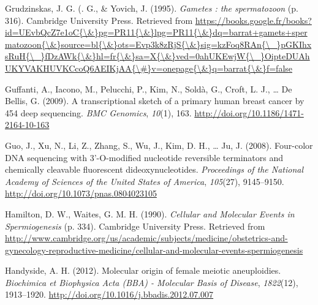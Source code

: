 \documentclass[12pt,twoside]{reedthesis}
\theoremstyle{definition}
\theoremstyle{definition}
\theoremstyle{remark}
\begin{document}
  \hypertarget{ref-Grudzinskas1995}{}
  Grudzinskas, J. G. (. G., \& Yovich, J. (1995). \emph{Gametes : the
  spermatozoon} (p. 316). Cambridge University Press. Retrieved from
  \href{https://books.google.fr/books?id=UEvbQcZ7e1oC\%7B/\&\%7Dpg=PR11\%7B/\&\%7Dlpg=PR11\%7B/\&\%7Ddq=barrat+gamets+spermatozoon\%7B/\&\%7Dsource=bl\%7B/\&\%7Dots=Evp3k8zRjS\%7B/\&\%7Dsig=kzFoq8RAn\%7B/_\%7DpGKIhxsRuH\%7B/_\%7DfDzAWk\%7B/\&\%7Dhl=fr\%7B/\&\%7Dsa=X\%7B/\&\%7Dved=0ahUKEwjW\%7B/_\%7DOipteDUAhUKYVAKHUVKCcoQ6AEIKjAA\%7B/\#\%7Dv=onepage\%7B/\&\%7Dq=barrat\%7B/\&\%7Df=false}{https://books.google.fr/books?id=UEvbQcZ7e1oC\{\textbackslash{}\&\}pg=PR11\{\textbackslash{}\&\}lpg=PR11\{\textbackslash{}\&\}dq=barrat+gamets+spermatozoon\{\textbackslash{}\&\}source=bl\{\textbackslash{}\&\}ots=Evp3k8zRjS\{\textbackslash{}\&\}sig=kzFoq8RAn\{\textbackslash{}\_\}pGKIhxsRuH\{\textbackslash{}\_\}fDzAWk\{\textbackslash{}\&\}hl=fr\{\textbackslash{}\&\}sa=X\{\textbackslash{}\&\}ved=0ahUKEwjW\{\textbackslash{}\_\}OipteDUAhUKYVAKHUVKCcoQ6AEIKjAA\{\textbackslash{}\#\}v=onepage\{\textbackslash{}\&\}q=barrat\{\textbackslash{}\&\}f=false}
  
  \hypertarget{ref-Guffanti2009}{}
  Guffanti, A., Iacono, M., Pelucchi, P., Kim, N., Soldà, G., Croft, L.
  J., \ldots{} De Bellis, G. (2009). A transcriptional sketch of a primary
  human breast cancer by 454 deep sequencing. \emph{BMC Genomics},
  \emph{10}(1), 163. \url{http://doi.org/10.1186/1471-2164-10-163}
  
  \hypertarget{ref-Guo2008}{}
  Guo, J., Xu, N., Li, Z., Zhang, S., Wu, J., Kim, D. H., \ldots{} Ju, J.
  (2008). Four-color DNA sequencing with 3'-O-modified nucleotide
  reversible terminators and chemically cleavable fluorescent
  dideoxynucleotides. \emph{Proceedings of the National Academy of
  Sciences of the United States of America}, \emph{105}(27), 9145--9150.
  \url{http://doi.org/10.1073/pnas.0804023105}
  
  \hypertarget{ref-Hamilton1987}{}
  Hamilton, D. W., Waites, G. M. H. (1990). \emph{Cellular and Molecular
  Events in Spermiogenesis} (p. 334). Cambridge University Press.
  Retrieved from
  \url{http://www.cambridge.org/us/academic/subjects/medicine/obstetrics-and-gynecology-reproductive-medicine/cellular-and-molecular-events-spermiogenesis}
  
  \hypertarget{ref-Handyside2012}{}
  Handyside, A. H. (2012). Molecular origin of female meiotic
  aneuploidies. \emph{Biochimica et Biophysica Acta (BBA) - Molecular
  Basis of Disease}, \emph{1822}(12), 1913--1920.
  \url{http://doi.org/10.1016/j.bbadis.2012.07.007}
  
\end{document}
